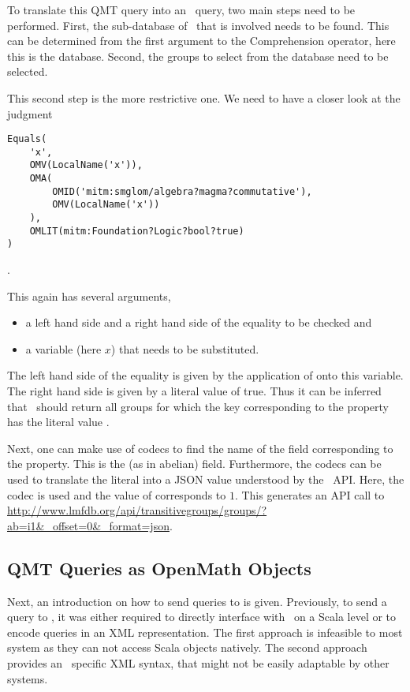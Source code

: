 To translate this QMT query into an \lmfdb\ query, two main steps need to be performed. 
First, the sub-database of \lmfdb\ that is involved needs to be found. 
This can be determined from the first argument to the Comprehension operator, here this is the  database. 
Second, the groups to select from the database need to be selected. 

This second step is the more restrictive one.
We need to have a closer look at the  judgment \begin{lstlisting}[language=qmt]
Equals(
	'x', 
	OMV(LocalName('x')), 
	OMA(
		OMID('mitm:smglom/algebra?magma?commutative'), 
		OMV(LocalName('x'))
	), 
	OMLIT(mitm:Foundation?Logic?bool?true)
)
\end{lstlisting}. 

This again has several arguments, \begin{itemize}
	\item a left hand side and a right hand side of the equality to be checked and 
	\item a variable (here $x$) that needs to be substituted.
\end{itemize}
The left hand side of the equality is given by the application of  onto this variable. 
The right hand side is given by a literal value of true. 
Thus it can be inferred that \lmfdb\ should return all groups for which the key corresponding to the  property has the literal value . 

Next, one can make use of codecs to find the name of the field corresponding to the  property. 
This is the  (as in abelian) field. 
Furthermore, the codecs can be used to translate the literal  into a JSON value understood by the \lmfdb\ API. 
Here, the codec  is used and the value of  corresponds to $1$. 
This generates an API call to \url{http://www.lmfdb.org/api/transitivegroups/groups/?ab=i1&_offset=0&_format=json}. 

\subsection{QMT Queries as OpenMath Objects}\label{sec:comm:mmt}

Next, an introduction on how to send queries to \mmt is given. 
Previously, to send a query to \mmt, it was either required to directly interface with \mmt\ on a Scala level or to encode queries in an XML representation. 
The first approach is infeasible to most system as they can not access Scala objects natively. 
The second approach provides an \mmt\ specific XML syntax, that might not be easily adaptable by other systems. 

